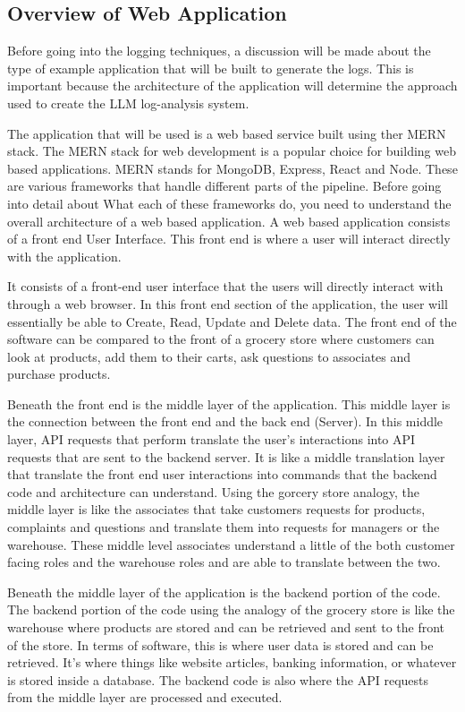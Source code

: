 \documentclass[sigconf]{acmart}
\begin{document}
\subsection{Overview of Web Application}

Before going into the logging techniques, a discussion will be made about the type of example application that will be built to generate the logs. This is important because the architecture of the application will determine the approach used to create the LLM log-analysis system.


The application that will be used is a web based service built using ther MERN stack. The MERN stack for web development is a popular choice for building web based applications. MERN stands for MongoDB, Express, React and Node. These are various frameworks that handle different parts of the pipeline. Before going into detail about What each of these frameworks do, you need to understand the overall architecture of a web based application. A web based application consists of a front end User Interface. This front end is where a user will interact directly with the application. 

It consists of a front-end user interface that the users will directly interact with through a web browser. In this front end section of the application, the user will essentially  be able to Create, Read, Update and Delete data. The front end of the software can be compared to the front of a grocery store where customers can look at products,  add them to their carts, ask questions to associates and purchase products.

Beneath the front end is the middle layer of the application. This middle layer is the connection between the front end and the back end (Server). In this middle layer, API requests that perform translate the user's interactions into API requests that are sent to the backend server. It is like a middle translation layer that translate the front end user interactions into commands that the backend code and architecture can understand. Using the gorcery store analogy, the middle layer is like the associates that take customers requests for products, complaints and questions and translate them into requests for managers or the warehouse. These middle level associates understand a little of the both customer facing roles and the warehouse roles and are able to translate between the two.

Beneath the middle layer of the application is the backend portion of the code. The backend portion of the code using the analogy of the grocery store is like the warehouse where products are stored and can be retrieved and sent to the front of the store. In terms of software, this is where user data is stored and can be retrieved. It's where things like website articles, banking information, or whatever is stored inside a database. The backend code is also where the API requests from the middle layer are processed and executed.
\end{document}
